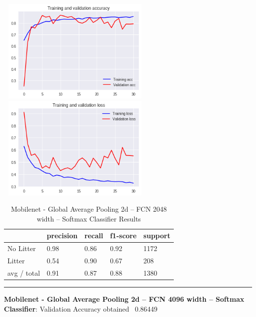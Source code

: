 \documentclass{IEEEtran}
\begin{document}
 \includegraphics[width=3in,height=2in]{mobilenet-img/mobilenet-img007.png} 
\includegraphics[width=3in,height=2in]{mobilenet-img/mobilenet-img008.png} 


\bigskip

\begin{table}[ht]
\centering
\caption{Mobilenet - Global Average Pooling 2d -- FCN 2048 width -- Softmax Classifier Results}
\begin{tabular}{|l|l|l|l|l|} 
\hline
 & precision & recall  & f1-score  & support \\\hline
No Litter  &
0.98 &
0.86 &
0.92 &
1172 \\\hline
Litter &
0.54 &
0.90 &
0.67  &
208\\\hline
avg / total &
0.91 &
0.87 &
0.88 &
1380\\\hline
\end{tabular}
\end{table}

\begin{center}\noindent\rule{8cm}{0.4pt}\end{center}

\textbf{Mobilenet - Global Average Pooling 2d -- FCN 4096 width -- Softmax Classifier}: Validation Accuracy obtained \ 0.86449


\bigskip


\bigskip
\end{document}
